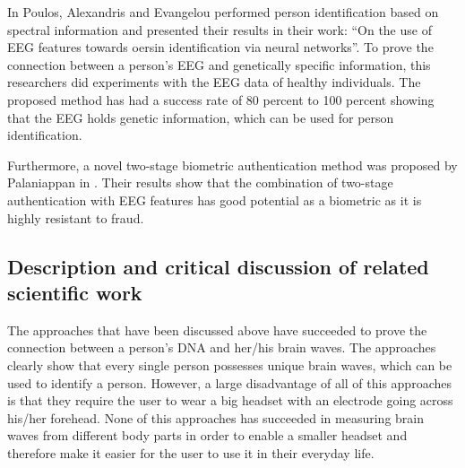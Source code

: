 In \cite{Poulos01personidentification} Poulos, Alexandris and Evangelou performed person identification based on spectral information and presented their results in their work: “On the use of EEG features towards oersin identification via neural networks”. To prove the connection between a person's EEG and genetically specific information, this researchers did experiments with the EEG data of healthy individuals. The proposed method has had a success rate of 80 percent to 100 percent showing that the EEG holds genetic information, which can be used for person identification.


Furthermore, a novel two-stage biometric authentication method was proposed by Palaniappan in \cite{Palaniappan08}. Their results show that the combination of two-stage authentication with EEG features has good potential as a biometric as it is highly resistant to fraud.

\subsection{Description and critical discussion of related scientific work}
The approaches that have been discussed above have succeeded to prove the connection between a person's DNA and her/his brain waves. The approaches clearly show that every single person possesses unique brain waves, which can be used to identify a person. However, a large disadvantage of all of this approaches is that they require the user to wear a big headset with an electrode going across his/her forehead. None of this approaches has succeeded in measuring brain waves from different body parts in order to enable a smaller headset and therefore make it easier for the user to use it in their everyday life.

